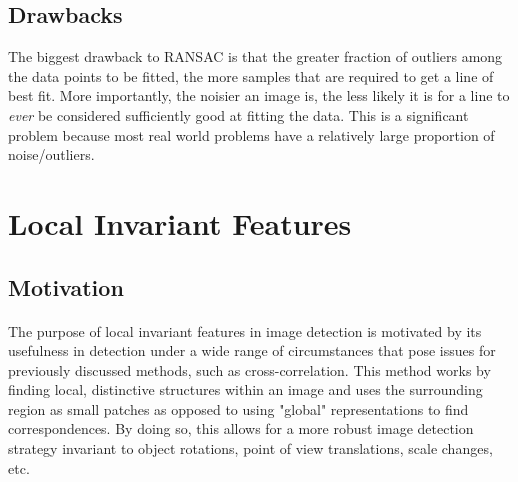 \documentclass{article}
\begin{document}
\subsection{Drawbacks}
The biggest drawback to RANSAC is that the greater fraction of outliers among the data points to be fitted, the more samples that are required to get a line of best fit. More importantly, the noisier an image is, the less likely it is for a line to \textit{ever} be considered sufficiently good at fitting the data. This is a significant problem because most real world problems have a relatively large proportion of noise/outliers.


\section{Local Invariant Features}
\subsection{Motivation}
\paragraph{} The purpose of local invariant features in image detection  is motivated by its usefulness in detection under a wide range of circumstances that pose issues for previously discussed methods, such as cross-correlation. This method works by finding local, distinctive structures within an image and uses the surrounding region as small patches as opposed to using "global" representations to find correspondences. By doing so, this allows for a more robust image detection strategy invariant to object rotations, point of view translations, scale changes, etc.
\end{document}
